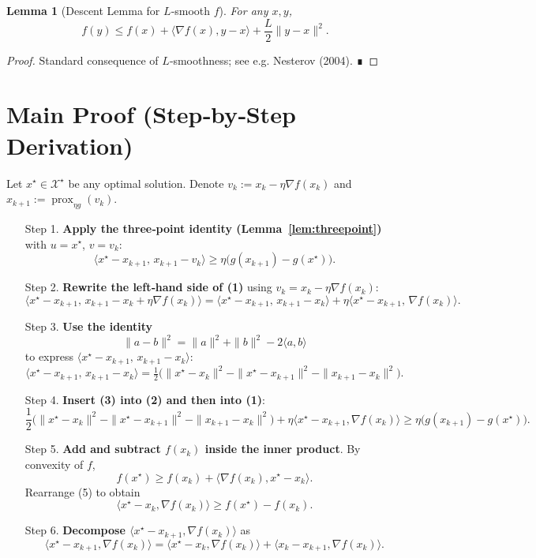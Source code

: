 \documentclass{article}
\newtheorem{lemma}{Lemma}
\newcommand{\prox}{\operatorname{prox}}
\newcommand{\grad}{\nabla}
\begin{document}
\begin{lemma}[Descent Lemma for $L$‑smooth $f$]\label{lem:descent}
For any $x,y$,
\[
f(y)\le f(x)+\langle\grad f(x),y-x\rangle+\frac{L}{2}\|y-x\|^2 .
\]
\end{lemma}
\begin{proof}
Standard consequence of $L$‑smoothness; see e.g. Nesterov (2004). ∎
\end{proof}

\section*{Main Proof (Step‑by‑Step Derivation)}
Let $x^\star\in\mathcal{X}^\star$ be any optimal solution.  
Denote $v_k:=x_k-\eta\grad f(x_k)$ and $x_{k+1}:=\prox_{\eta g}(v_k)$.  

\begin{enumerate}
\item[Step 1.] \textbf{Apply the three‑point identity (Lemma~\ref{lem:threepoint})} with $u=x^\star$, $v=v_k$:
\[
\langle x^\star-x_{k+1},\,x_{k+1}-v_k\rangle
\ge \eta\big(g(x_{k+1})-g(x^\star)\big).
\tag{1}
\]
\item[Step 2.] \textbf{Rewrite the left‑hand side of (1)} using $v_k=x_k-\eta\grad f(x_k)$:
\[
\langle x^\star-x_{k+1},\,x_{k+1}-x_k+\eta\grad f(x_k)\rangle
= \langle x^\star-x_{k+1},\,x_{k+1}-x_k\rangle
+\eta\langle x^\star-x_{k+1},\,\grad f(x_k)\rangle .
\tag{2}
\]
\item[Step 3.] \textbf{Use the identity}
\[
\|a-b\|^2 = \|a\|^2+\|b\|^2-2\langle a,b\rangle
\]
to express $\langle x^\star-x_{k+1},\,x_{k+1}-x_k\rangle$:
\[
\langle x^\star-x_{k+1},\,x_{k+1}-x_k\rangle
= \tfrac12\Big(\|x^\star-x_k\|^2-\|x^\star-x_{k+1}\|^2-\|x_{k+1}-x_k\|^2\Big).
\tag{3}
\]
\item[Step 4.] \textbf{Insert (3) into (2) and then into (1)}:
\[
\frac12\Big(\|x^\star-x_k\|^2-\|x^\star-x_{k+1}\|^2-\|x_{k+1}-x_k\|^2\Big)
+\eta\langle x^\star-x_{k+1},\grad f(x_k)\rangle
\ge \eta\big(g(x_{k+1})-g(x^\star)\big).\tag{4}
\]
\item[Step 5.] \textbf{Add and subtract $f(x_k)$ inside the inner product}. By convexity of $f$,
\[
f(x^\star)\ge f(x_k)+\langle\grad f(x_k),x^\star-x_k\rangle .
\tag{5}
\]
Rearrange (5) to obtain
\[
\langle x^\star-x_k,\grad f(x_k)\rangle \ge f(x^\star)-f(x_k).
\tag{6}
\]
\item[Step 6.] \textbf{Decompose $\langle x^\star-x_{k+1},\grad f(x_k)\rangle$} as
\[
\langle x^\star-x_{k+1},\grad f(x_k)\rangle
= \langle x^\star-x_k,\grad f(x_k)\rangle
+ \langle x_k-x_{k+1},\grad f(x_k)\rangle .
\]
\end{enumerate}
\end{document}
